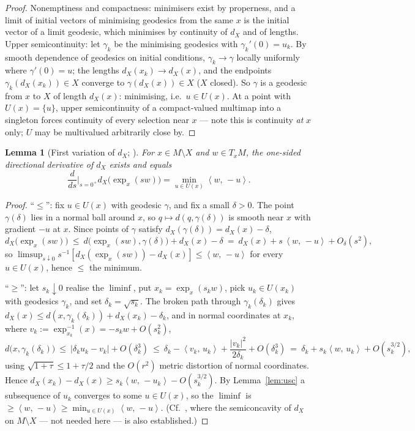 \documentclass[11pt]{article}
\newtheorem{lemma}[theorem]{Lemma}
\theoremstyle{remark}
\newcommand{\X}{X}
\newcommand{\dX}{d_{\X}}
\newcommand{\sca}[2]{\left\langle #1,\, #2\right\rangle}
\begin{document}
\begin{proof}
Nonemptiness and compactness: minimisers exist by properness, and a
limit of initial vectors of minimising geodesics from the same $x$ is
the initial vector of a limit geodesic, which minimises by continuity
of $\dX$ and of lengths. Upper semicontinuity: let
$\gamma_{k}$ be the minimising geodesics with
$\gamma_{k}'(0)=u_{k}$. By smooth dependence of geodesics on initial
conditions, $\gamma_{k}\to\gamma$ locally uniformly where
$\gamma'(0)=u$; the lengths $\dX(x_{k})\to\dX(x)$, and the endpoints
$\gamma_{k}(\dX(x_{k}))\in\X$ converge to $\gamma(\dX(x))\in\X$ ($\X$
closed). So $\gamma$ is a geodesic from $x$ to $\X$ of length
$\dX(x)$: minimising, i.e.\ $u\in U(x)$. At a point with
$U(x)=\{u\}$, upper semicontinuity of a compact-valued multimap into a
singleton forces continuity of every selection near $x$ --- note this
is continuity \emph{at} $x$ only; $U$ may be multivalued arbitrarily
close by.
\end{proof}

\begin{lemma}[First variation of $\dX$; {\cite[\S3]{MM}}]
\label{lem:firstvar}
For $x\in M\setminus\X$ and $w\in T_{x}M$, the one-sided directional
derivative of $\dX$ exists and equals
\[
  \frac{d}{ds}\Big|_{s=0^{+}}\dX\bigl(\exp_{x}(sw)\bigr)
  =\min_{u\in U(x)}\sca{w}{-u}.
\]
\end{lemma}

\begin{proof}
``$\le$'': fix $u\in U(x)$ with geodesic $\gamma$, and fix a small
$\delta>0$. The point $\gamma(\delta)$ lies in a normal ball around
$x$, so $q\mapsto d(q,\gamma(\delta))$ is smooth near $x$ with
gradient $-u$ at $x$. Since points of $\gamma$ satisfy
$\dX(\gamma(\delta))=\dX(x)-\delta$,
\[
  \dX\bigl(\exp_{x}(sw)\bigr)
  \ \le\ d\bigl(\exp_{x}(sw),\gamma(\delta)\bigr)+\dX(x)-\delta
  \ =\ \dX(x)+s\,\sca{w}{-u}+O_{\delta}(s^{2}),
\]
so $\limsup_{s\downarrow0}s^{-1}[\dX(\exp_{x}(sw))-\dX(x)]\le
\sca{w}{-u}$ for every $u\in U(x)$, hence $\le$ the minimum.

``$\ge$'': let $s_{k}\downarrow0$ realise the $\liminf$, put
$x_{k}=\exp_{x}(s_{k}w)$, pick $u_{k}\in U(x_{k})$ with geodesics
$\gamma_{k}$, and set $\delta_{k}=\sqrt{s_{k}}$. The broken path
through $\gamma_{k}(\delta_{k})$ gives
$\dX(x)\le d(x,\gamma_{k}(\delta_{k}))+\dX(x_{k})-\delta_{k}$, and in
normal coordinates at $x_{k}$, where
$v_{k}:=\exp_{x_{k}}^{-1}(x)=-s_{k}w+O(s_{k}^{2})$,
\[
  d\bigl(x,\gamma_{k}(\delta_{k})\bigr)
  \ \le\ |\delta_{k}u_{k}-v_{k}|+O(\delta_{k}^{3})
  \ \le\ \delta_{k}-\sca{v_{k}}{u_{k}}+\frac{|v_{k}|^{2}}{2\delta_{k}}
  +O(\delta_{k}^{3})
  \ =\ \delta_{k}+s_{k}\sca{w}{u_{k}}+O(s_{k}^{3/2}),
\]
using $\sqrt{1+\tau}\le1+\tau/2$ and the $O(r^{2})$ metric distortion
of normal coordinates. Hence
$\dX(x_{k})-\dX(x)\ge s_{k}\sca{w}{-u_{k}}-O(s_{k}^{3/2})$. By
Lemma~\ref{lem:usc} a subsequence of $u_{k}$ converges to some
$u\in U(x)$, so the $\liminf$ is $\ge\sca{w}{-u}\ge\min_{u\in U(x)}
\sca{w}{-u}$. (Cf.\ \cite[\S3]{MM}, where the semiconcavity of $\dX$
on $M\setminus\X$ --- not needed here --- is also established.)
\end{proof}
\end{document}
